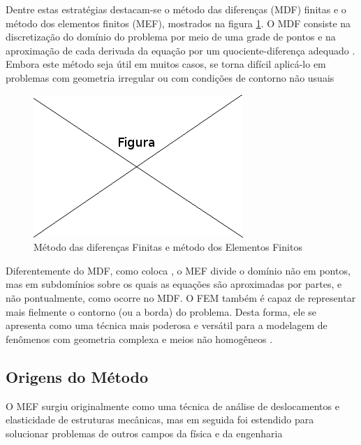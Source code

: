 \documentclass[
    12pt,               %
    openright,          %
    oneside,
    a4paper,            %
    english,            %
    french,             %
    spanish,            %
    brazil              %
    ]{abntex2}
\begin{document}
Dentre estas estratégias destacam-se o método das diferenças (MDF) finitas e o método dos elementos finitos (MEF), mostrados na figura \ref{fig:mdfFem}. O MDF consiste na discretização do domínio do problema por meio de uma grade de pontos e na aproximação de cada derivada da equação por um quociente-diferença adequado
\cite[p. 684]{burdenFaires}. Embora este método seja útil em muitos casos, se torna difícil aplicá-lo em problemas com geometria irregular ou com condições de contorno não usuais \cite[p. 4]{huebner}

\begin{figure}[!htb]
\centering
\includegraphics[scale=0.5]{figuras/temp.png}
\caption{Método das diferenças Finitas e método dos Elementos Finitos}
\label{fig:mdfFem}
\end{figure}

Diferentemente do MDF, como coloca \cite[p. 4]{huebner}, o MEF divide o domínio não em pontos, mas em subdomínios sobre os quais as equações são aproximadas por partes, e não pontualmente, como ocorre no MDF. O FEM também é capaz de representar mais fielmente o contorno (ou a borda) do problema. Desta forma, ele se apresenta como uma técnica mais poderosa e versátil para a modelagem de fenômenos com geometria complexa e meios não homogêneos \cite[p. 390]{sadiku}. 


\subsection{Origens do Método}

O MEF surgiu originalmente como uma técnica de análise de deslocamentos e elasticidade de estruturas mecânicas, mas em seguida foi estendido para solucionar problemas de outros campos da física e da engenharia \cite[p. 19]{jin} \cite[p. 3]{desai} \cite[p. 2]{zien}
\end{document}
